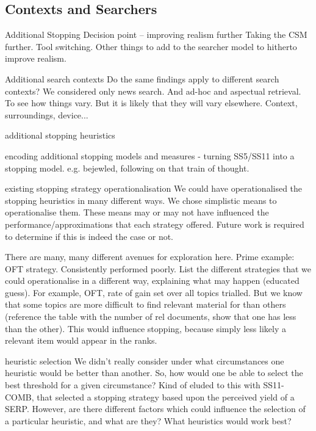 \subsection{Contexts and Searchers}















Additional Stopping Decision point -- improving realism further
Taking the CSM further. Tool switching. Other things to add to the searcher model to hitherto improve realism.

Additional search contexts
Do the same findings apply to different search contexts? We considered only news search. And ad-hoc and aspectual retrieval. To see how things vary. But it is likely that they will vary elsewhere. Context, surroundings, device...

additional stopping heuristics

encoding additional stopping models and measures
    - turning SS5/SS11 into a stopping model. e.g. bejewled, following on that train of thought.

existing stopping strategy operationalisation
We could have operationalised the stopping heuristics in many different ways. We chose simplistic means to operationalise them. These means may or may not have influenced the performance/approximations that each strategy offered. Future work is required to determine if this is indeed the case or not.

There are many, many different avenues for exploration here. Prime example: OFT strategy. Consistently performed poorly. List the different strategies that we could operationalise in a different way, explaining what may happen (educated guess).
For example, OFT, rate of gain set over all topics trialled. But we know that some topics are more difficult to find relevant material for than others (reference the table with the number of rel documents, show that one has less than the other). This would influence stopping, because simply less likely a relevant item would appear in the ranks.

heuristic selection
We didn't really consider under what circumstances one heuristic would be better than another. So, how would one be able to select the best threshold for a given circumstance? Kind of eluded to this with SS11-COMB, that selected a stopping strategy based upon the perceived yield of a SERP. However, are there different factors which could influence the selection of a particular heuristic, and what are they? What heuristics would work best?

